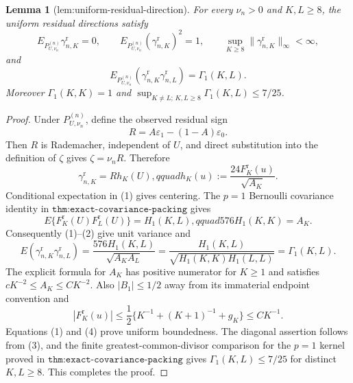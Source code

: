 \documentclass{article}
\newtheorem{lemma}{Lemma}
\begin{document}
\begin{lemma}[lem:uniform-residual-direction]\label{lem:uniform-residual-direction}
For every \(\nu_n>0\) and \(K,L\geq8\), the uniform residual directions satisfy
\[
 E_{P_{U,\nu_n}^{(n)}}\gamma_{n,K}^{\mathrm r}=0,\qquad
 E_{P_{U,\nu_n}^{(n)}}(\gamma_{n,K}^{\mathrm r})^2=1,
 \qquad \sup_{K\geq8}\|\gamma_{n,K}^{\mathrm r}\|_\infty<\infty,
\]
and
\[
 E_{P_{U,\nu_n}^{(n)}}(\gamma_{n,K}^{\mathrm r}\gamma_{n,L}^{\mathrm r})
 =\Gamma_1(K,L).
\]
Moreover \(\Gamma_1(K,K)=1\) and \(\sup_{K\ne L;\,K,L\geq8}\Gamma_1(K,L)\leq7/25\).
\end{lemma}
\begin{proof}
Under \(P_{U,\nu_n}^{(n)}\), define the observed residual sign
\[
 R=A\varepsilon_1-(1-A)\varepsilon_0.
\]
Then \(R\) is Rademacher, independent of \(U\), and direct substitution into the definition of \(\zeta\) gives \(\zeta=\nu_nR\).  Therefore
\[
 \gamma_{n,K}^{\mathrm r}=R h_K(U),qquad
 h_K(u):=\frac{24F_K^{\mathrm r}(u)}{\sqrt{A_K}}.                         \tag{1}
\]
Conditional expectation in (1) gives centering.  The \(p=1\) Bernoulli covariance identity in \(\texttt{thm:exact-covariance-packing}\) gives
\[
 E\{F_K^{\mathrm r}(U)F_L^{\mathrm r}(U)\}=H_1(K,L),qquad
 576H_1(K,K)=A_K.                                                           \tag{2}
\]
Consequently (1)--(2) give unit variance and
\[
 E(\gamma_{n,K}^{\mathrm r}\gamma_{n,L}^{\mathrm r})
 =\frac{576H_1(K,L)}{\sqrt{A_KA_L}}
 =\frac{H_1(K,L)}{\sqrt{H_1(K,K)H_1(L,L)}}=\Gamma_1(K,L).                \tag{3}
\]
The explicit formula for \(A_K\) has positive numerator for \(K\geq1\) and satisfies \(cK^{-2}\leq A_K\leq CK^{-2}\).  Also \(|B_1|\leq1/2\) away from its immaterial endpoint convention and
\[
 |F_K^{\mathrm r}(u)|
 \leq\frac12\{K^{-1}+(K+1)^{-1}+g_K\}\leq CK^{-1}.                      \tag{4}
\]
Equations (1) and (4) prove uniform boundedness.  The diagonal assertion follows from (3), and the finite greatest-common-divisor comparison for the \(p=1\) kernel proved in \(\texttt{thm:exact-covariance-packing}\) gives \(\Gamma_1(K,L)\leq7/25\) for distinct \(K,L\geq8\).  This completes the proof.
\end{proof}
\end{document}
